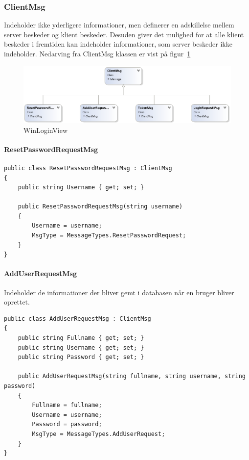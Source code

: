 \subsubsection{ClientMsg}
Indeholder ikke yderligere informationer, men definerer en adskillelse mellem server beskeder og klient beskeder. Desuden giver det mulighed for at alle klient beskeder i fremtiden kan indeholder informationer, som server beskeder ikke indeholder. Nedarving fra ClientMsg klassen er vist på figur~\ref{fig:ClientMsgUML}

\begin{figure}
	\centering
	\includegraphics[width=0.9\linewidth]{figs/connection/ClientMsgUML.png}
	\caption{WinLoginView}
	\label{fig:ClientMsgUML}
\end{figure}

\paragraph{ResetPasswordRequestMsg}
\begin{lstlisting}[caption=ResetPasswordRequestMsg, label=code:ResetPasswordRequestMsg]
public class ResetPasswordRequestMsg : ClientMsg
{
	public string Username { get; set; }
	
	public ResetPasswordRequestMsg(string username)
	{
		Username = username;
		MsgType = MessageTypes.ResetPasswordRequest;
	}
}
\end{lstlisting}

\paragraph{AddUserRequestMsg}
Indeholder de informationer der bliver gemt i databasen når en bruger bliver oprettet.
\begin{lstlisting}[caption=AddUserRequestMsg, label=code:AddUserRequestMsg]
public class AddUserRequestMsg : ClientMsg
{
	public string Fullname { get; set; }
	public string Username { get; set; }
	public string Password { get; set; }
	
	public AddUserRequestMsg(string fullname, string username, string password)
	{
		Fullname = fullname;
		Username = username;
		Password = password;
		MsgType = MessageTypes.AddUserRequest;
	}
}
\end{lstlisting}

